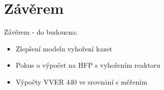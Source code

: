 \documentclass{beamer}
\begin{document}
\section{Závěrem}

\begin{frame}{Závěrem - do budoucna:}

	\begin{itemize}
		\item Zlepšení modelu vyhoření kazet 
		\item Pokus o výpočet na HFP s vyhořením reaktoru
		\item Výpočty VVER 440 ve srovnání s měřením
	\end{itemize}
\end{frame}
\end{document}
